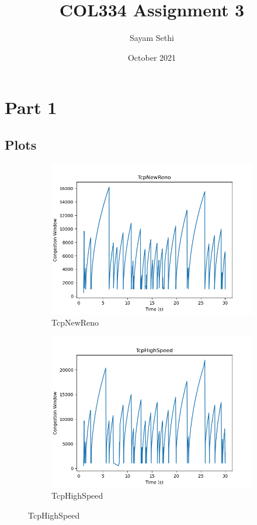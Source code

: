 \documentclass[11pt]{article}
\title{COL334 Assignment 3}
\author{Sayam Sethi}
\date{October 2021}
\begin{document}
\maketitle

\tableofcontents

\section{Part 1}

\subsection{Plots}
\begin{figure}[H]
  \begin{subfigure}{0.5\textwidth}
    \centering
    \includegraphics[width=0.9\linewidth]{Q1/outputs/TcpNewReno.png}
    \caption{TcpNewReno}
  \end{subfigure}
  \begin{subfigure}{0.5\textwidth}
    \centering
    \includegraphics[width=0.9\linewidth]{Q1/outputs/TcpHighSpeed.png}
    \caption{TcpHighSpeed}
  \end{subfigure}
\end{figure}
\end{document}
